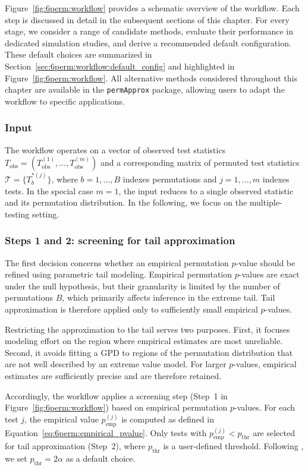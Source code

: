 Figure~\ref{fig:6perm:workflow} provides a schematic overview of the workflow. Each step is discussed in detail in the subsequent sections of this chapter. For every stage, we consider a range of candidate methods, evaluate their performance in dedicated simulation studies, and derive a recommended default configuration. These default choices are summarized in Section~\ref{sec:6perm:workflow:default_config} and highlighted in Figure~\ref{fig:6perm:workflow}. All alternative methods considered throughout this chapter are available in the \texttt{permApprox} package, allowing users to adapt the workflow to specific applications.


\subsubsection*{Input}

The workflow operates on a vector of observed test statistics $T_{\mathrm{obs}} = (T_{\mathrm{obs}}^{(1)}, \dots, T_{\mathrm{obs}}^{(m)})$ and a corresponding matrix of permuted test statistics $\mathcal{T} = \{T_b^{*(j)}\}$, where $b = 1, \dots, B$ indexes permutations and $j = 1, \dots, m$ indexes tests. In the special case $m = 1$, the input reduces to a single observed statistic and its permutation distribution. In the following, we focus on the multiple-testing setting.

\subsubsection*{Steps 1 and 2: screening for tail approximation}

The first decision concerns whether an empirical permutation $p$-value should be refined using parametric tail modeling. Empirical permutation $p$-values are exact under the null hypothesis, but their granularity is limited by the number of permutations $B$, which primarily affects inference in the extreme tail. Tail approximation is therefore applied only to sufficiently small empirical $p$-values. 

Restricting the approximation to the tail serves two purposes. First, it focuses modeling effort on the region where empirical estimates are most unreliable. Second, it avoids fitting a GPD to regions of the permutation distribution that are not well described by an extreme value model. For larger $p$-values, empirical estimates are sufficiently precise and are therefore retained.

Accordingly, the workflow applies a screening step (Step~1 in Figure~\ref{fig:6perm:workflow}) based on empirical permutation $p$-values. For each test $j$, the empirical value $p_{\mathrm{emp}}^{(j)}$ is computed as defined in Equation~\eqref{eq:6perm:empirical_pvalue}. Only tests with $p_{\mathrm{emp}}^{(j)} < p_{\mathrm{thr}}$ are selected for tail approximation (Step~2), where $p_{\mathrm{thr}}$ is a user-defined threshold. Following \citet{winkler2016faster}, we set $p_{\mathrm{thr}} = 2\alpha$ as a default choice.

